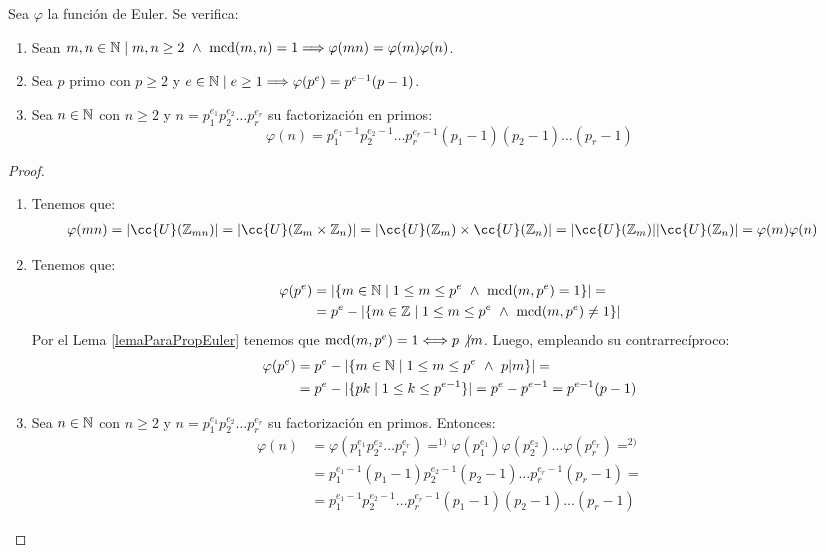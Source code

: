 \begin{prop}
    \label{propFuncionEuler}
    Sea $\varphi$ la función de Euler. Se verifica:
    \begin{enumerate}
        \item Sean $m,n \in \mathbb N \mid m,n\geq 2 \ \land \  \operatorname{mcd}(m,n)=1 \Longrightarrow \varphi(mn)=\varphi(m)\varphi(n)$.
        \item Sea $p$ primo con $p\geq 2$ y $e\in \mathbb N \mid e\geq 1 \Longrightarrow \varphi(p^e) = p^{e-1}(p-1)$.
        \item Sea $n\in \mathbb N$ con $n\geq 2$ y $n=p_1^{e_1}p_2^{e_2}\ldots p_r^{e_r}$ su factorización en primos:
        $$\varphi(n) = p_1^{e_1-1}p_2^{e_2-1}\ldots p_r^{e_r-1}(p_1-1)(p_2-1)\ldots(p_r-1)$$
    \end{enumerate}
\begin{proof}~
    \begin{enumerate}
        \item Tenemos que:
        \begin{align*}
            \varphi(mn) &= |\cc{U}(\Z_{mn})| = |\cc{U}(\Z_m \times \Z_n)| = |\cc{U}(\Z_m) \times \cc{U}(\Z_n)| = |\cc{U}(\Z_m)||\cc{U}(\Z_n)| = \varphi(m)\varphi(n)
        \end{align*}
        \item Tenemos que:
        \begin{align*}
            \varphi(p^e) &= |\{m \in \mathbb N \mid 1\leq m\leq p^e \ \land \  \operatorname{mcd}(m,p^e) = 1\}|
            =\\&= p^e - |\{m \in \mathbb Z \mid 1\leq m\leq p^e \ \land \  \operatorname{mcd}(m,p^e) \neq 1\}|
        \end{align*}
        Por el Lema \ref{lemaParaPropEuler} tenemos que $\operatorname{mcd}(m,p^e)=1 \Longleftrightarrow p\not|m$. Luego, empleando su contrarrecíproco:
        \begin{align*}
            \varphi(p^e) &= p^e - |\{m \in \mathbb N \mid 1 \leq m \leq p^e \ \land \  p|m\}| =\\
            &=p^e - |\{pk \mid 1\leq k \leq p^{e-1}\}| = p^e - p^{e-1} = p^{e-1}(p-1)
        \end{align*}
        \item Sea $n\in \mathbb N$ con $n\geq 2$ y $n=p_1^{e_1}p_2^{e_2}\ldots p_r^{e_r}$ su factorización en primos. Entonces:
        \begin{align*}
            \varphi(n) &= \varphi(p_1^{e_1}p_2^{e_2}\ldots p_r^{e_r}) \mathop{=}^{1)} \varphi(p_1^{e_1})\varphi(p_2^{e_2})\ldots\varphi(p_r^{e_r}) \mathop{=}^{2)}\\
            &=p_1^{e_1-1}(p_1-1)p_2^{e_2-1}(p_2-1)\ldots p_r^{e_r-1}(p_r-1) =\\
            &=p_1^{e_1-1}p_2^{e_2-1}\ldots p_r^{e_r-1}(p_1-1)(p_2-1)\ldots(p_r-1)
        \end{align*}
    \end{enumerate}
\end{proof}
\end{prop}


